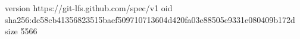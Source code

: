 version https://git-lfs.github.com/spec/v1
oid sha256:dc58cb41356823515baef509710713604d420fa03e88505e9331e080409b172d
size 5566
